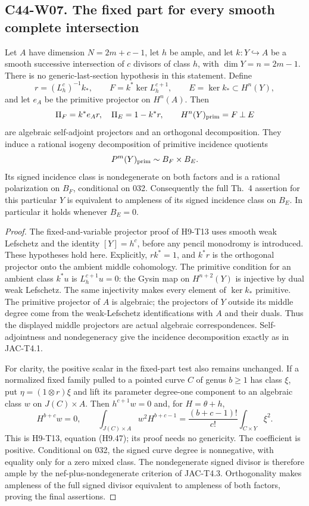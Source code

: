 \subsection*{C44-W07. The fixed part for every smooth complete intersection}

\begin{proposition}
Let $A$ have dimension $N=2m+c-1$, let $h$ be ample, and let
$k:Y\hookrightarrow A$ be a smooth successive intersection of
$c$ divisors of class $h$, with $\dim Y=n=2m-1$. There is no
generic-last-section hypothesis in this statement. Define
\[
 r=(L_h^c)^{-1}k_*,\qquad
 F=k^*\ker L_h^{c+1},\qquad E=\ker k_*\subset H^n(Y),
\]
and let $e_A$ be the primitive projector on $H^n(A)$. Then
\[
 \Pi_F=k^*e_A r,\quad \Pi_E=1-k^*r,\qquad
 H^n(Y)_{\rm prim}=F\mathbin\perp E
\]
are algebraic self-adjoint projectors and an orthogonal decomposition.
They induce a rational isogeny decomposition of primitive incidence
quotients
\[
 P^m(Y)_{\rm prim}\sim B_F\times B_E.
\]
Its signed incidence class is nondegenerate on both factors and is
a rational polarization on $B_F$, conditional on 032. Consequently
the full Th.~4 assertion for this particular $Y$ is equivalent to
ampleness of its signed incidence class on $B_E$. In particular it
holds whenever $B_E=0$.
\end{proposition}

\begin{proof}
The fixed-and-variable projector proof of H9-T13 uses smooth weak
Lefschetz and the identity $[Y]=h^c$, before any pencil monodromy is
introduced. These hypotheses hold here. Explicitly,
$rk^*=1$, and $k^*r$ is the orthogonal projector onto the ambient
middle cohomology. The primitive condition for an ambient class
$k^*u$ is $L_h^{c+1}u=0$: the Gysin map on $H^{n+2}(Y)$ is
injective by dual weak Lefschetz. The same injectivity makes every
element of $\ker k_*$ primitive. The primitive projector of $A$
is algebraic; the projectors of $Y$ outside its middle degree come
from the weak-Lefschetz identifications with $A$ and their duals.
Thus the displayed middle projectors are actual algebraic
correspondences. Self-adjointness and nondegeneracy give the
incidence decomposition exactly as in JAC-T4.1.

For clarity, the positive scalar in the fixed-part test also remains
unchanged. If a normalized fixed family pulled to a pointed curve
$C$ of genus $b\geq1$ has class $\xi$, put $\eta=(1\otimes r)\xi$
and lift its parameter degree-one component to an algebraic class
$w$ on $J(C)\times A$. Then $h^{c+1}w=0$ and, for
$H=\theta+h$,
\[
 H^{b+c}w=0,\qquad
 \int_{J(C)\times A}w^2H^{b+c-1}
   =\frac{(b+c-1)!}{c!}\int_{C\times Y}\xi^2.
\]
This is H9-T13, equation (H9.47); its proof needs no genericity.
The coefficient is positive. Conditional on 032, the signed curve
degree is nonnegative, with equality only for a zero mixed class.
The nondegenerate signed divisor is therefore ample by the
nef-plus-nondegenerate criterion of JAC-T4.3. Orthogonality makes
ampleness of the full signed divisor equivalent to ampleness of
both factors, proving the final assertions.
\end{proof}

